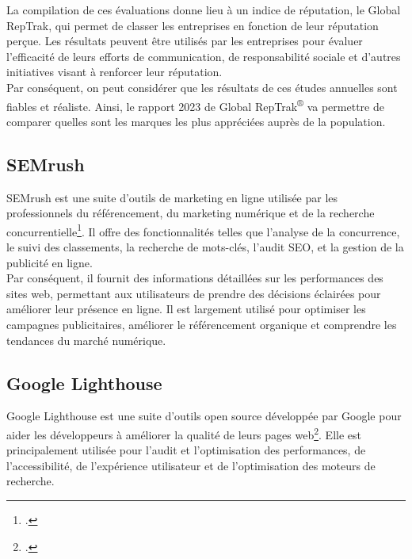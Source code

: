 \documentclass[12pt, a4paper]{report}
\begin{document}
La compilation de ces évaluations donne lieu à un indice de réputation, le Global RepTrak, qui permet de classer les entreprises en fonction de leur réputation perçue. Les résultats peuvent être utilisés par les entreprises pour évaluer l'efficacité de leurs efforts de communication, de responsabilité sociale et d'autres initiatives visant à renforcer leur réputation.\\

Par conséquent, on peut considérer que les résultats de ces études annuelles sont fiables et réaliste. Ainsi, le rapport 2023 de Global RepTrak\textsuperscript{\tiny{®}} va permettre de comparer quelles sont les marques les plus appréciées auprès de la population.

\subsection{SEMrush}

SEMrush est une suite d'outils de marketing en ligne utilisée par les professionnels du référencement, du marketing numérique et de la recherche concurrentielle\footcite{noauthor_semrush_2023}. Il offre des fonctionnalités telles que l'analyse de la concurrence, le suivi des classements, la recherche de mots-clés, l'audit SEO, et la gestion de la publicité en ligne.\\

Par conséquent, il fournit des informations détaillées sur les performances des sites web, permettant aux utilisateurs de prendre des décisions éclairées pour améliorer leur présence en ligne. Il est largement utilisé pour optimiser les campagnes publicitaires, améliorer le référencement organique et comprendre les tendances du marché numérique.

\subsection{Google Lighthouse}

Google Lighthouse est une suite d'outils open source développée par Google pour aider les développeurs à améliorer la qualité de leurs pages web\footcite{noauthor_google_2023}. Elle est principalement utilisée pour l'audit et l'optimisation des performances, de l'accessibilité, de l'expérience utilisateur et de l'optimisation des moteurs de recherche.\\
\end{document}
